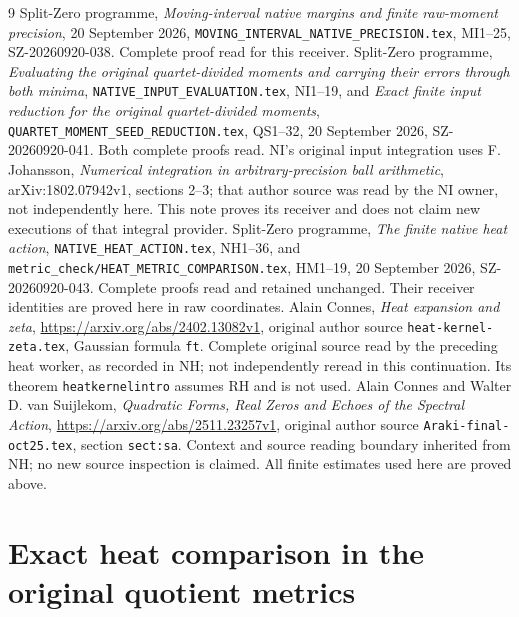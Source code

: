 \begin{thebibliography}{9}
 Split-Zero programme, \emph{Moving-interval native margins
and finite raw-moment precision}, 20 September 2026,
\texttt{MOVING\_INTERVAL\_NATIVE\_PRECISION.tex}, MI1--25,
SZ-20260920-038. Complete proof read for this receiver.
 Split-Zero programme, \emph{Evaluating the original
quartet-divided moments and carrying their errors through both minima},
\texttt{NATIVE\_INPUT\_EVALUATION.tex}, NI1--19, and
\emph{Exact finite input reduction for the original quartet-divided moments},
\texttt{QUARTET\_MOMENT\_SEED\_REDUCTION.tex}, QS1--32,
20 September 2026, SZ-20260920-041. Both complete proofs read.
NI's original input integration uses F. Johansson,
\emph{Numerical integration in arbitrary-precision ball arithmetic},
arXiv:1802.07942v1, sections 2--3; that author source was read by the
NI owner, not independently here. This note proves its receiver and
does not claim new executions of that integral provider.
 Split-Zero programme, \emph{The finite native heat action},
\texttt{NATIVE\_HEAT\_ACTION.tex}, NH1--36, and
\texttt{metric\_check/HEAT\_METRIC\_COMPARISON.tex}, HM1--19,
20 September 2026, SZ-20260920-043. Complete proofs read and retained
unchanged. Their receiver identities are proved here in raw coordinates.
 Alain Connes, \emph{Heat expansion and zeta},
\url{https://arxiv.org/abs/2402.13082v1}, original author source
\texttt{heat-kernel-zeta.tex}, Gaussian formula \texttt{ft}.
Complete original source read by the preceding heat worker, as recorded
in NH; not independently reread in this continuation. Its theorem
\texttt{heatkernelintro} assumes RH and is not used.
 Alain Connes and Walter D. van Suijlekom,
\emph{Quadratic Forms, Real Zeros and Echoes of the Spectral Action},
\url{https://arxiv.org/abs/2511.23257v1}, original author source
\texttt{Araki-final-oct25.tex}, section \texttt{sect:sa}.
Context and source reading boundary inherited from NH; no new source
inspection is claimed. All finite estimates used here are proved above.
\end{thebibliography}

\endgroup

\clearpage\begingroup
\part*{Exact heat comparison in the original quotient metrics}
\newtheorem{hemtheorem}{Theorem}
\newtheorem{hemlemma}{Lemma}
\newcommand{\hemtr}{\operatorname{tr}}
\newcommand{\hemrank}{\operatorname{rank}}
\newcommand{\hemadjzero}{\dagger_0}
\newcommand{\hemadjg}{\dagger_G}
\newcommand{\hemRea}{\operatorname{Re}}



